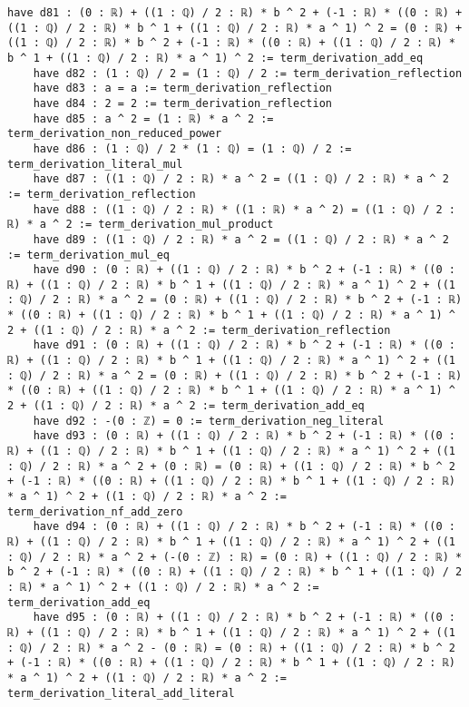 \documentclass{article}
\begin{document}
\begin{tcolorbox}[colback=white!10, width=\linewidth]
\begin{lstlisting}[language=Lean4]
    have d81 : (0 : ℝ) + ((1 : ℚ) / 2 : ℝ) * b ^ 2 + (-1 : ℝ) * ((0 : ℝ) + ((1 : ℚ) / 2 : ℝ) * b ^ 1 + ((1 : ℚ) / 2 : ℝ) * a ^ 1) ^ 2 = (0 : ℝ) + ((1 : ℚ) / 2 : ℝ) * b ^ 2 + (-1 : ℝ) * ((0 : ℝ) + ((1 : ℚ) / 2 : ℝ) * b ^ 1 + ((1 : ℚ) / 2 : ℝ) * a ^ 1) ^ 2 := term_derivation_add_eq
    have d82 : (1 : ℚ) / 2 = (1 : ℚ) / 2 := term_derivation_reflection
    have d83 : a = a := term_derivation_reflection
    have d84 : 2 = 2 := term_derivation_reflection
    have d85 : a ^ 2 = (1 : ℝ) * a ^ 2 := term_derivation_non_reduced_power
    have d86 : (1 : ℚ) / 2 * (1 : ℚ) = (1 : ℚ) / 2 := term_derivation_literal_mul
    have d87 : ((1 : ℚ) / 2 : ℝ) * a ^ 2 = ((1 : ℚ) / 2 : ℝ) * a ^ 2 := term_derivation_reflection
    have d88 : ((1 : ℚ) / 2 : ℝ) * ((1 : ℝ) * a ^ 2) = ((1 : ℚ) / 2 : ℝ) * a ^ 2 := term_derivation_mul_product
    have d89 : ((1 : ℚ) / 2 : ℝ) * a ^ 2 = ((1 : ℚ) / 2 : ℝ) * a ^ 2 := term_derivation_mul_eq
    have d90 : (0 : ℝ) + ((1 : ℚ) / 2 : ℝ) * b ^ 2 + (-1 : ℝ) * ((0 : ℝ) + ((1 : ℚ) / 2 : ℝ) * b ^ 1 + ((1 : ℚ) / 2 : ℝ) * a ^ 1) ^ 2 + ((1 : ℚ) / 2 : ℝ) * a ^ 2 = (0 : ℝ) + ((1 : ℚ) / 2 : ℝ) * b ^ 2 + (-1 : ℝ) * ((0 : ℝ) + ((1 : ℚ) / 2 : ℝ) * b ^ 1 + ((1 : ℚ) / 2 : ℝ) * a ^ 1) ^ 2 + ((1 : ℚ) / 2 : ℝ) * a ^ 2 := term_derivation_reflection
    have d91 : (0 : ℝ) + ((1 : ℚ) / 2 : ℝ) * b ^ 2 + (-1 : ℝ) * ((0 : ℝ) + ((1 : ℚ) / 2 : ℝ) * b ^ 1 + ((1 : ℚ) / 2 : ℝ) * a ^ 1) ^ 2 + ((1 : ℚ) / 2 : ℝ) * a ^ 2 = (0 : ℝ) + ((1 : ℚ) / 2 : ℝ) * b ^ 2 + (-1 : ℝ) * ((0 : ℝ) + ((1 : ℚ) / 2 : ℝ) * b ^ 1 + ((1 : ℚ) / 2 : ℝ) * a ^ 1) ^ 2 + ((1 : ℚ) / 2 : ℝ) * a ^ 2 := term_derivation_add_eq
    have d92 : -(0 : ℤ) = 0 := term_derivation_neg_literal
    have d93 : (0 : ℝ) + ((1 : ℚ) / 2 : ℝ) * b ^ 2 + (-1 : ℝ) * ((0 : ℝ) + ((1 : ℚ) / 2 : ℝ) * b ^ 1 + ((1 : ℚ) / 2 : ℝ) * a ^ 1) ^ 2 + ((1 : ℚ) / 2 : ℝ) * a ^ 2 + (0 : ℝ) = (0 : ℝ) + ((1 : ℚ) / 2 : ℝ) * b ^ 2 + (-1 : ℝ) * ((0 : ℝ) + ((1 : ℚ) / 2 : ℝ) * b ^ 1 + ((1 : ℚ) / 2 : ℝ) * a ^ 1) ^ 2 + ((1 : ℚ) / 2 : ℝ) * a ^ 2 := term_derivation_nf_add_zero
    have d94 : (0 : ℝ) + ((1 : ℚ) / 2 : ℝ) * b ^ 2 + (-1 : ℝ) * ((0 : ℝ) + ((1 : ℚ) / 2 : ℝ) * b ^ 1 + ((1 : ℚ) / 2 : ℝ) * a ^ 1) ^ 2 + ((1 : ℚ) / 2 : ℝ) * a ^ 2 + (-(0 : ℤ) : ℝ) = (0 : ℝ) + ((1 : ℚ) / 2 : ℝ) * b ^ 2 + (-1 : ℝ) * ((0 : ℝ) + ((1 : ℚ) / 2 : ℝ) * b ^ 1 + ((1 : ℚ) / 2 : ℝ) * a ^ 1) ^ 2 + ((1 : ℚ) / 2 : ℝ) * a ^ 2 := term_derivation_add_eq
    have d95 : (0 : ℝ) + ((1 : ℚ) / 2 : ℝ) * b ^ 2 + (-1 : ℝ) * ((0 : ℝ) + ((1 : ℚ) / 2 : ℝ) * b ^ 1 + ((1 : ℚ) / 2 : ℝ) * a ^ 1) ^ 2 + ((1 : ℚ) / 2 : ℝ) * a ^ 2 - (0 : ℝ) = (0 : ℝ) + ((1 : ℚ) / 2 : ℝ) * b ^ 2 + (-1 : ℝ) * ((0 : ℝ) + ((1 : ℚ) / 2 : ℝ) * b ^ 1 + ((1 : ℚ) / 2 : ℝ) * a ^ 1) ^ 2 + ((1 : ℚ) / 2 : ℝ) * a ^ 2 := term_derivation_literal_add_literal

\end{lstlisting}
\end{tcolorbox}
\end{document}
